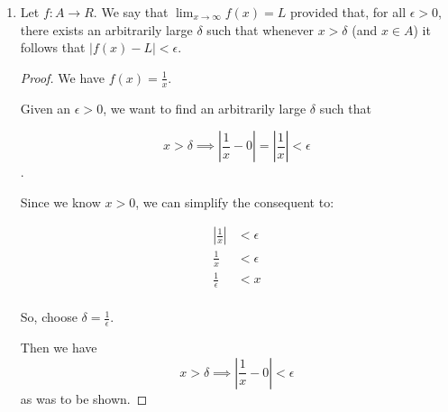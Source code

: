 \documentclass[12pt,letterpaper]{article}
\begin{document}
\begin{enumerate}[label=Exercise 4.2.\arabic*]
\begin{enumerate}
\begin{proof}
            \begin{align*}
              \frac{1}{x^2} &> \epsilon \\
              \frac{1}{\epsilon} &> x^2 \\
              \frac{1}{\sqrt{\epsilon}} &> \left|x\right| \\
            \end{align*}

            So, choose $\delta = \frac{1}{\sqrt{\epsilon}}$.

            Then we have
            \[
              0 < \left|x\right| < \delta \implies \frac{1}{x^2} > \epsilon
            \]
            as was to be shown.

          \end{proof}

        \item

          Let $f : A \to R$.
          We say that $\lim_{x \to \infty} f(x) = L$ provided that, for all $\epsilon > 0$, there exists an arbitrarily large $\delta$
          such that whenever $x > \delta$ (and $x \in A$) it follows that $\left|f(x) - L\right| < \epsilon$.

          \begin{proof}
            We have $f(x) = \frac{1}{x}$.

            Given an $\epsilon > 0$,
            we want to find an arbitrarily large $\delta$ such that

            \[
              x > \delta \implies \left|\frac{1}{x} - 0\right| = \left|\frac{1}{x}\right| < \epsilon
            \].

            Since we know $x > 0$, we can simplify the consequent to:

            \begin{align*}
              \left|\frac{1}{x}\right| &< \epsilon \\
              \frac{1}{x} &< \epsilon \\
              \frac{1}{\epsilon} &< x \\
            \end{align*}

            So, choose $\delta = \frac{1}{\epsilon}$.

            Then we have
            \[
              x > \delta \implies \left|\frac{1}{x} - 0\right| < \epsilon
            \]
            as was to be shown.

          \end{proof}


\end{enumerate}
\end{enumerate}
\end{document}
